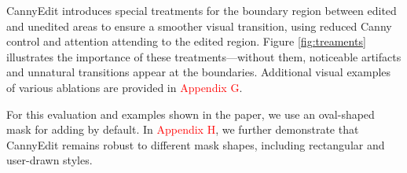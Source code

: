 \documentclass{article}
\begin{document}



CannyEdit introduces special treatments for the boundary region between edited and unedited areas to ensure a smoother visual transition, using reduced Canny control and attention attending to the edited region. Figure \ref{fig:treaments} illustrates the importance of these treatments—without them, noticeable artifacts and unnatural transitions appear at the boundaries. Additional visual examples of various ablations are provided in \textcolor{red}{Appendix G}.

For this evaluation and examples shown in the paper, we use an oval-shaped mask for adding by default. In \textcolor{red}{Appendix H}, we further demonstrate that CannyEdit remains robust to different mask shapes, including rectangular and user-drawn styles.
\end{document}
